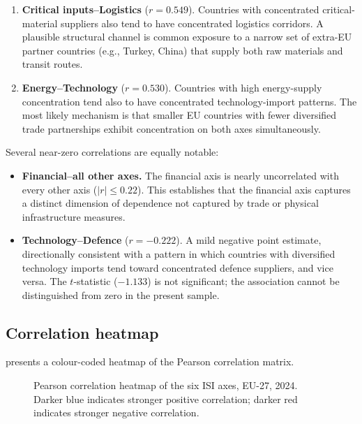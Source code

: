 \begin{enumerate}[leftmargin=2em]
  \item \textbf{Critical inputs--Logistics} ($r = 0.549$).
    Countries with concentrated critical-material suppliers also tend
    to have concentrated logistics corridors.  A plausible structural
    channel is common exposure to a narrow set of extra-EU partner
    countries (e.g., Turkey, China) that supply both raw materials
    and transit routes.

  \item \textbf{Energy--Technology} ($r = 0.530$).
    Countries with high energy-supply concentration tend also to have
    concentrated technology-import patterns.  The most likely
    mechanism is that smaller EU countries with fewer diversified
    trade partnerships exhibit concentration on both axes
    simultaneously.
\end{enumerate}

Several near-zero correlations are equally notable:

\begin{itemize}[leftmargin=2em]
  \item \textbf{Financial--all other axes.}  The financial axis is
    nearly uncorrelated with every other axis ($|r| \leq 0.22$).
    This establishes that the financial axis captures a distinct dimension
    of dependence not captured by trade or physical infrastructure
    measures.

  \item \textbf{Technology--Defence} ($r = -0.222$).  A mild negative
    point estimate, directionally consistent with a pattern in which
    countries with diversified technology imports tend toward
    concentrated defence suppliers, and vice versa.  The $t$-statistic
    ($-1.133$) is not significant; the association cannot be
    distinguished from zero in the present sample.
\end{itemize}

\subsection{Correlation heatmap}

 presents a colour-coded heatmap of the
Pearson correlation matrix.

\begin{figure}[htbp]
\centering

\caption{Pearson correlation heatmap of the six ISI axes, EU-27,
  2024.  Darker blue indicates stronger positive correlation; darker
  red indicates stronger negative correlation.}
\label{fig:corr-heatmap}
\end{figure}

